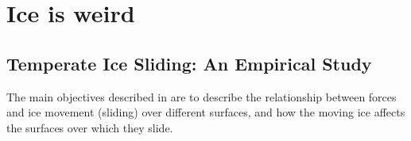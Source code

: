 \chapter{Ice is weird}
\section{Temperate Ice Sliding: An Empirical Study}




The main objectives described in\cite{Budd_Keage_Blundy_1979} are to describe the relationship between forces and ice movement (sliding) over different surfaces, and how the moving ice affects the surfaces over which they slide.

